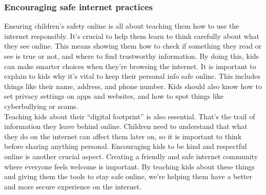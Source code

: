 \documentclass[a4paper, 10 pt, conference]{ieeeconf}  %
\begin{document}
\subsubsection{Encouraging safe internet practices}
Ensuring children’s safety online is all about teaching them how to use the internet responsibly. It’s crucial to help them learn to think carefully about what they see online. This means showing them how to check if something they read or see is true or not, and where to find trustworthy information. By doing this, kids can make smarter choices when they’re browsing the internet. It is important to explain to kids why it’s vital to keep their personal info safe online. This includes things like their name, address, and phone number. Kids should also know how to set privacy settings on apps and websites, and how to spot things like cyberbullying or scams. 
\\ Teaching kids about their “digital footprint” is also essential. That’s the trail of information they leave behind online. Children need to understand that what they do on the internet can affect them later on, so it is important to think before sharing anything personal. Encouraging kids to be kind and respectful online is another crucial aspect. Creating a friendly and safe internet community where everyone feels welcome is important. By teaching kids about these things and giving them the tools to stay safe online, we’re helping them have a better and more secure experience on the internet.
\end{document}
